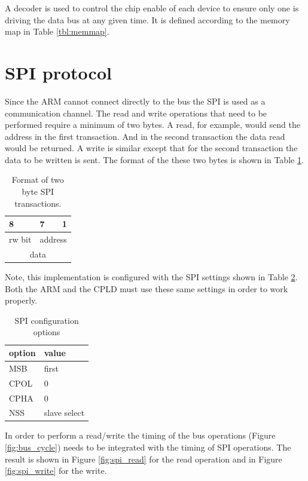 \documentclass{article}
\begin{document}
A decoder is used to control the chip enable of each device
to ensure only one is driving the data bus at any given time.
It is defined according to the memory map in Table \ref{tbl:memmap}.


\section{SPI protocol}
\label{sec:spi}

Since the ARM cannot connect directly to the bus the SPI
is used as a communication channel.
The read and write operations that need to be performed
require a minimum of two bytes.
A read, for example, would send the address in the first transaction.
And in the second transaction the data read would be returned.
A write is similar except that for the second transaction the
data to be written is sent.
The format of the these two bytes is shown in Table \ref{tbl:spiformat}.

\begin{table}[hbp]
\center
\begin{tabular}{|c|c|c|}
    \multicolumn{1}{l}{8} & \multicolumn{1}{l}{7} & \multicolumn{1}{r}{1} \\
\hline
rw bit & \multicolumn{2}{|c|}{address} \\
\hline
\multicolumn{3}{|c|}{data} \\
\hline
\end{tabular}
\caption{Format of two byte SPI transactions.}
\label{tbl:spiformat}
\end{table}

Note, this implementation is configured with the SPI settings
shown in Table \ref{tbl:spi}.
Both the ARM and the CPLD must use these same settings in order
to work properly.

\begin{table}
\center
\begin{tabular}{|l|l|}
	\hline
	option & value \\
	\hline
	MSB & first \\
	CPOL & 0 \\
	CPHA & 0 \\
	NSS & slave select\\
	\hline
\end{tabular}
\caption{SPI configuration options}
\label{tbl:spi}
\end{table}

In order to perform a read/write the timing of the bus operations
(Figure \ref{fig:bus_cycle}) needs to be integrated with the
timing of SPI operations.
The result is shown in Figure \ref{fig:spi_read} for the
read operation and in Figure \ref{fig:spi_write} for the write.
\end{document}
